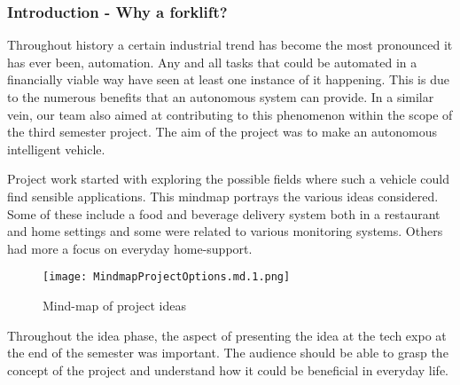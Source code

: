 \documentclass[../report.tex]{subfiles}
\begin{document}

\subsubsection{Introduction - Why a forklift?}
    Throughout history a certain industrial trend has become the most pronounced 
    it has ever been, automation. Any and all tasks that could be automated in a
    financially viable way have seen at least one instance of it happening. This
    is due to the numerous benefits that an autonomous system can provide. In a
    similar vein, our team also aimed at contributing to this phenomenon within 
    the scope of the third semester project. The aim of the project was to make
    an autonomous intelligent vehicle.

    Project work started with exploring the possible fields where such a vehicle
    could find sensible applications. This mindmap portrays the various ideas considered. 
    Some of these include a food and beverage delivery system both in a restaurant and home
    settings and some were related to various monitoring systems. Others had more a focus
    on everyday home-support.

    \begin{figure}[H]
        \centering
        \texttt{[image: MindmapProjectOptions.md.1.png]}
        \caption{Mind-map of project ideas}
    \end{figure}   

    Throughout the idea phase, the aspect of presenting the idea at the tech
    expo at the end of the semester was important. The audience should be able
    to grasp the concept of the project and understand how it could be
    beneficial in everyday life.
\end{document}
